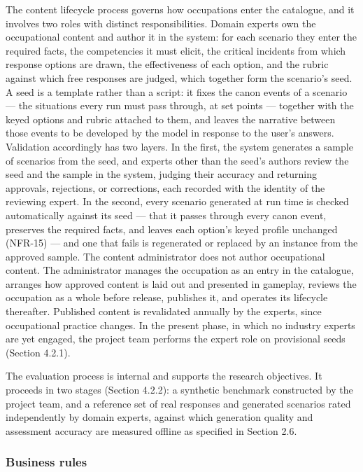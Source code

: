 The content lifecycle process governs how occupations enter the catalogue, and it involves two roles with distinct responsibilities. Domain experts own the occupational content and author it in the system: for each scenario they enter the required facts, the competencies it must elicit, the critical incidents from which response options are drawn, the effectiveness of each option, and the rubric against which free responses are judged, which together form the scenario's seed. A seed is a template rather than a script: it fixes the canon events of a scenario --- the situations every run must pass through, at set points --- together with the keyed options and rubric attached to them, and leaves the narrative between those events to be developed by the model in response to the user's answers. Validation accordingly has two layers. In the first, the system generates a sample of scenarios from the seed, and experts other than the seed's authors review the seed and the sample in the system, judging their accuracy and returning approvals, rejections, or corrections, each recorded with the identity of the reviewing expert. In the second, every scenario generated at run time is checked automatically against its seed --- that it passes through every canon event, preserves the required facts, and leaves each option's keyed profile unchanged (NFR-15) --- and one that fails is regenerated or replaced by an instance from the approved sample. The content administrator does not author occupational content. The administrator manages the occupation as an entry in the catalogue, arranges how approved content is laid out and presented in gameplay, reviews the occupation as a whole before release, publishes it, and operates its lifecycle thereafter. Published content is revalidated annually by the experts, since occupational practice changes. In the present phase, in which no industry experts are yet engaged, the project team performs the expert role on provisional seeds (Section 4.2.1).

The evaluation process is internal and supports the research objectives. It proceeds in two stages (Section 4.2.2): a synthetic benchmark constructed by the project team, and a reference set of real responses and generated scenarios rated independently by domain experts, against which generation quality and assessment accuracy are measured offline as specified in Section 2.6.

\subsubsection{Business rules}

